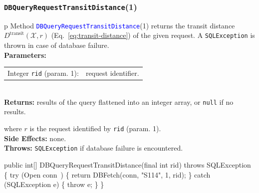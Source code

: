 \documentclass{article}
\def\nwendcode{\endtrivlist \endgroup}      %
\let\nwdocspar=\par
\theoremstyle{definition}                   %
\begin{document}
\subsubsection{{\tt{}\protect{}DBQueryRequestTransitDistance}(1)}
\begin{tabular}{p{\textwidth}}
\toprule
{}
Method \textcolor{blue}{{\tt{}\protect{}DBQueryRequestTransitDistance}}(1) returns the
transit distance $D^\textrm{transit}(\mathcal{X},r)$
(Eq.~\ref{eq:transit-distance}) of the given request.
A {\tt{}SQLException} is thrown in case of database failure.\\
\midrule
\textbf{Parameters:}\\
\begin{tabular}{lp{116mm}}
Integer {\tt{}rid} (param. 1):&request identifier.
\end{tabular}\\
\textbf{Returns:} results of the query flattened into an integer array,
or {\tt{}null} if no results.


where $r$ is the request identified by {\tt{}rid} (param. 1).\\
\textbf{Side Effects:} none.\\
\textbf{Throws:} {\tt{}SQLException} if database failure is encountered.\\
\bottomrule
\end{tabular}
\nwenddocs{}\plusendmoddef
public int[] DBQueryRequestTransitDistance(final int rid) throws SQLException \{
  try (\LA{}Open \code{}conn\edoc{}~{\nwtagstyle{}}\RA{}) \{
    return DBFetch(conn, "S114", 1, rid);
  \} catch (SQLException e) \{
    throw e;
  \}
\}
\eatline
{}\nwendcode{}\nwdocspar
\end{document}
